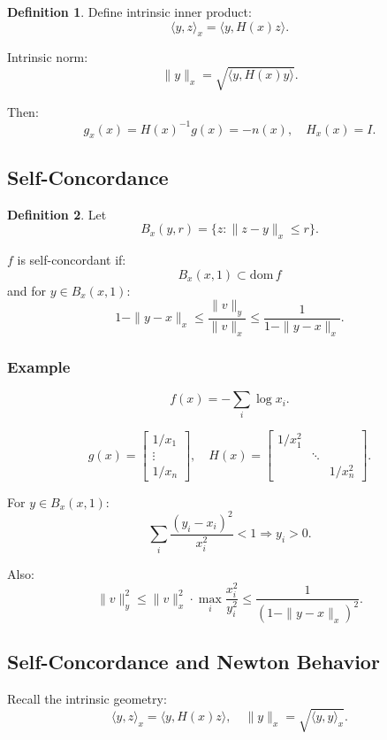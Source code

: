 \documentclass[12pt,oneside]{book}
\numberwithin{equation}{section}
\theoremstyle{definition}
\newtheorem{definition}{Definition}[section]
\theoremstyle{plain}
\theoremstyle{remark}
\begin{document}
\begin{definition}
Define intrinsic inner product:
\[
\langle y,z \rangle_x = \langle y, H(x) z \rangle.
\]

Intrinsic norm:
\[
\|y\|_x = \sqrt{\langle y, H(x) y \rangle}.
\]
\end{definition}

\noindent
Then:
\[
g_x(x) = H(x)^{-1} g(x) = -n(x),
\quad
H_x(x) = I.
\]

\subsection{Self-Concordance}

\begin{definition}
Let
\[
B_x(y,r) = \{z : \|z-y\|_x \le r\}.
\]

$f$ is self-concordant if:
\[
B_x(x,1) \subset \mathrm{dom}\,f
\]
and for $y \in B_x(x,1)$:
\[
1 - \|y-x\|_x
\le
\frac{\|v\|_y}{\|v\|_x}
\le
\frac{1}{1-\|y-x\|_x}.
\]
\end{definition}

\subsubsection*{Example}

\[
f(x) = -\sum_i \log x_i.
\]

\[
g(x) =
\begin{bmatrix}
1/x_1 \\ \vdots \\ 1/x_n
\end{bmatrix},
\quad
H(x) =
\begin{bmatrix}
1/x_1^2 & & \\
& \ddots & \\
& & 1/x_n^2
\end{bmatrix}.
\]

For $y \in B_x(x,1)$:
\[
\sum_i \frac{(y_i-x_i)^2}{x_i^2} < 1
\Rightarrow y_i > 0.
\]

Also:
\[
\|v\|_y^2
\le
\|v\|_x^2 \cdot \max_i \frac{x_i^2}{y_i^2}
\le
\frac{1}{(1-\|y-x\|_x)^2}.
\]

\subsection*{Self-Concordance and Newton Behavior}

Recall the intrinsic geometry:
\[
\langle y,z \rangle_x = \langle y, H(x) z \rangle,
\quad
\|y\|_x = \sqrt{\langle y,y \rangle_x}.
\]
\end{document}
